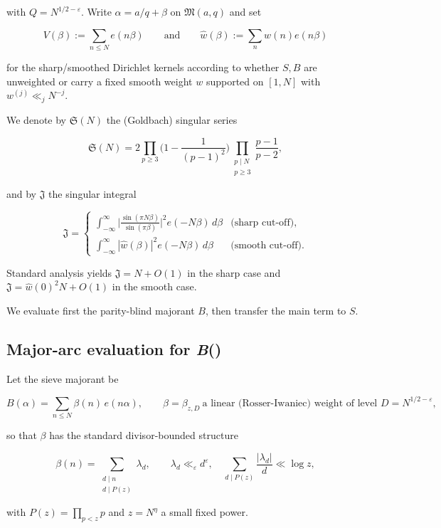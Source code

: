 \documentclass[11pt]{article}
\theoremstyle{definition}
\theoremstyle{remark}
\numberwithin{equation}{part}
\begin{document}
with $Q=N^{1/2-\varepsilon}$. Write $\alpha=a/q+\beta$ on $\mathfrak M(a,q)$ and set

$$
	V(\beta):=\sum_{n\le N}e(n\beta) \qquad\text{and}\qquad \widehat w(\beta):=\sum_{n}w(n)e(n\beta)
$$

for the sharp/smoothed Dirichlet kernels according to whether $S, B$ are unweighted or carry a fixed smooth weight $w$ supported on $[1,N]$ with $w^{(j)}\ll_j N^{-j}$.

We denote by $\mathfrak S(N)$ the (Goldbach) singular series

$$
	\mathfrak S(N)=2\prod_{p\ge 3}\Big(1-\frac1{(p-1)^2}\Big)
	\prod_{\substack{p\mid N\\ p\ge 3}}\frac{p-1}{p-2},
$$

and by $\mathfrak J$ the singular integral

$$
	\mathfrak J=
	\begin{cases}
		\displaystyle \int_{-\infty}^{\infty}\Big|\frac{\sin(\pi N\beta)}{\sin(\pi\beta)}\Big|^{\!2}e(-N\beta)\,d\beta
		 & \text{(sharp cut-off)},  \\[2ex]
		\displaystyle \int_{-\infty}^{\infty}|\widehat w(\beta)|^{2}e(-N\beta)\,d\beta
		 & \text{(smooth cut-off)}.
	\end{cases}
$$

Standard analysis yields $\mathfrak J=N+O(1)$ in the sharp case and $\mathfrak J=\widehat w(0)^2 N+O(1)$ in the smooth case.

We evaluate first the parity-blind majorant $B$, then transfer the main term to $S$.

\subsection{Major-arc evaluation for \textit{B}(\textalpha)}

Let the sieve majorant be

$$
	B(\alpha)=\sum_{n\le N}\beta(n)\,e(n\alpha),\qquad
	\beta=\beta_{z,D}\ \text{a linear (Rosser-Iwaniec) weight of level }D=N^{1/2-\varepsilon},
$$

so that $\beta$ has the standard divisor-bounded structure

$$
	\beta(n)=\sum_{\substack{d\mid n\\ d\mid P(z)}}\lambda_d,\qquad
	\lambda_d\ll_\varepsilon d^\varepsilon,\quad \sum_{d\mid P(z)}\frac{|\lambda_d|}{d}\ll \log z,
$$

with $P(z)=\prod_{p<z}p$ and $z=N^{\eta}$ a small fixed power.
\end{document}
